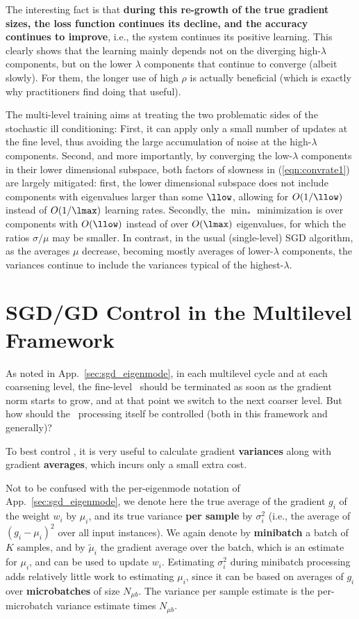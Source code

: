 \documentclass{article} %
\begin{document}
The interesting fact is that \textbf{during this re-growth of the true gradient sizes, the loss function continues its decline, and the accuracy continues to improve}, i.e., the system continues its positive learning. This clearly shows that the learning mainly depends not on the diverging high-$\lambda$ components, but on the lower $\lambda$ components that continue to converge (albeit slowly). For them, the longer use of high $\rho$ is actually beneficial (which is exactly why practitioners find doing that useful).

The multi-level training aims at treating the two problematic sides of the stochastic ill conditioning: First, it can apply only a small number of updates at the fine level, thus avoiding the large accumulation of noise at the high-$\lambda$ components. Second, and more importantly, by converging the low-$\lambda$ components in their lower dimensional subspace, both factors of slowness in (\ref{eqn:convrate1}) are largely mitigated: first, the lower dimensional subspace does not include components with eigenvalues larger than some $\llow$, allowing for $O(1/\llow)$ instead of $O(1/\lmax)$ learning rates. Secondly, the $\min_*$ minimization is over components with $O(\llow)$ instead of over $O(\lmax)$ eigenvalues, for which the ratios $\sigma/\mu$ may be  smaller. In contrast, in the usual (single-level) SGD algorithm, as the averages $\mu$ decrease, becoming mostly averages of lower-$\lambda$ components, the variances continue to include the variances typical of the highest-$\lambda$.


\section{SGD/GD Control in the Multilevel Framework}
\label{sec:control}

As noted in App.~\ref{sec:sgd_eigenmode}, in each multilevel cycle and at each coarsening level, the fine-level \SGD~should be terminated as soon as the gradient norm starts to grow, and at that point we switch to the next coarser level. But how should the \SGD~processing itself be controlled (both in this framework and generally)?

To best control \SGD, it is very useful to calculate gradient \textbf{variances} along with gradient \textbf{averages}, which incurs only a small extra cost.

Not to be confused with the per-eigenmode notation of App.~\ref{sec:sgd_eigenmode}, we denote here the true average of the gradient $g_i$ of the weight $w_i$ by $\mu_i$, and its true variance \textbf{per sample} by $\sigma_i^2$ (i.e., the average of $(g_i-\mu_i)^2$ over all input instances). We again denote by \textbf{minibatch} a batch of $K$ samples, and by $\tilde{\mu}_i$ the gradient average over the batch, which is an estimate for $\mu_i$, and can be used to update $w_i$. Estimating $\sigma_i^2$ during minibatch processing adds relatively little work to estimating $\mu_i$, since it can be based on averages of $g_i$ over \textbf{microbatches} of size $N_{\mu b}$. The variance per sample estimate is the per-microbatch variance estimate times $N_{\mu b}$.
\end{document}
